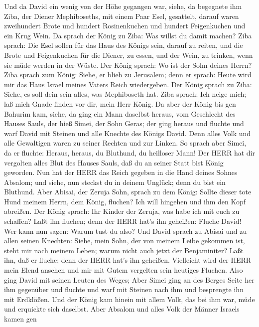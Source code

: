  Und da David ein wenig von der Höhe gegangen war, siehe, da
begegnete ihm Ziba, der Diener Mephiboseths, mit einem Paar Esel,
gesattelt, darauf waren zweihundert Brote und hundert Rosinenkuchen und
hundert Feigenkuchen und ein Krug Wein.  Da sprach der König
zu Ziba: Was willst du damit machen? Ziba sprach: Die Esel sollen für
das Haus des Königs sein, darauf zu reiten, und die Brote und
Feigenkuchen für die Diener, zu essen, und der Wein, zu trinken, wenn
sie müde werden in der Wüste.  Der König sprach: Wo ist der
Sohn deines Herrn? Ziba sprach zum König: Siehe, er blieb zu Jerusalem;
denn er sprach: Heute wird mir das Haus Israel meines Vaters Reich
wiedergeben.  Der König sprach zu Ziba: Siehe, es soll dein
sein alles, was Mephiboseth hat. Ziba sprach: Ich neige mich; laß mich
Gnade finden vor dir, mein Herr König.  Da aber der König
bis gen Bahurim kam, siehe, da ging ein Mann daselbst heraus, vom
Geschlecht des Hauses Sauls, der hieß Simei, der Sohn Geras; der ging
heraus und fluchte  und warf David mit Steinen und alle
Knechte des Königs David. Denn alles Volk und alle Gewaltigen waren zu
seiner Rechten und zur Linken.  So sprach aber Simei, da er
fluchte: Heraus, heraus, du Bluthund, du heilloser Mann! 
Der HERR hat dir vergolten alles Blut des Hauses Sauls, daß du an seiner
Statt bist König geworden. Nun hat der HERR das Reich gegeben in die
Hand deines Sohnes Absalom; und siehe, nun steckst du in deinem Unglück;
denn du bist ein Bluthund.  Aber Abisai, der Zeruja Sohn,
sprach zu dem König: Sollte dieser tote Hund meinem Herrn, dem König,
fluchen? Ich will hingehen und ihm den Kopf abreißen.  Der
König sprach: Ihr Kinder der Zeruja, was habe ich mit euch zu schaffen?
Laßt ihn fluchen; denn der HERR hat's ihn geheißen: Fluche David! Wer
kann nun sagen: Warum tust du also?  Und David sprach zu
Abisai und zu allen seinen Knechten: Siehe, mein Sohn, der von meinem
Leibe gekommen ist, steht mir nach meinem Leben; warum nicht auch jetzt
der Benjaminiter? Laßt ihn, daß er fluche; denn der HERR hat's ihn
geheißen.  Vielleicht wird der HERR mein Elend ansehen und
mir mit Gutem vergelten sein heutiges Fluchen.  Also ging
David mit seinen Leuten des Weges; Aber Simei ging an des Berges Seite
her ihm gegenüber und fluchte und warf mit Steinen nach ihm und
besprengte ihn mit Erdklößen.  Und der König kam hinein mit
allem Volk, das bei ihm war, müde und erquickte sich daselbst.
 Aber Absalom und alles Volk der Männer Israels kamen gen
